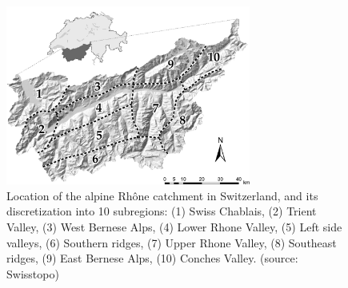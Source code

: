 \documentclass{ametsoc}
\begin{document}

%
%
%



%




%


\begin{figure}[t]
	\centerline{\includegraphics[width=19pc,angle=0]{fig01.pdf}}
	\caption{Location of the alpine Rh\^{o}ne catchment in Switzerland, and its discretization into 10 subregions:	(1) Swiss Chablais, (2) Trient Valley, (3) West Bernese Alps, (4) Lower Rhone Valley, (5) Left side valleys, (6) Southern ridges, (7) Upper Rhone Valley, (8) Southeast ridges, (9) East Bernese Alps, (10) Conches Valley. (source: Swisstopo)}
	\label{fig:map}
\end{figure}
\end{document}
